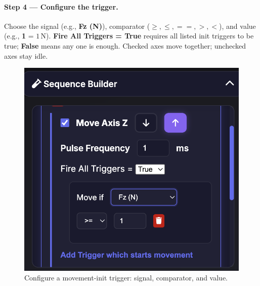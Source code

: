 \documentclass[
    twocolumn,
    fontsize = 10pt,
    parskip = half+,
    headings = small,
    headwidth = text,
    footwidth = text,
]{scrartcl}
\begin{document}
\paragraph{\textbf{Step 4 — Configure the trigger.}}
Choose the signal (e.g., \textbf{Fz (N)}), comparator (\textbf{$\ge, \le, ==, >, <$}), and value (e.g., \textbf{1} = $1$\,N). \textbf{Fire All Triggers = True} requires all listed init triggers to be true; \textbf{False} means any one is enough. Checked axes move together; unchecked axes stay idle.
\begin{figure}[htbp]\centering
  \includegraphics[width=.9\linewidth]{pics/sb-3.png}
  \caption{Configure a movement-init trigger: signal, comparator, and value.}
  \label{fig:sb-3}
\end{figure}
\end{document}
